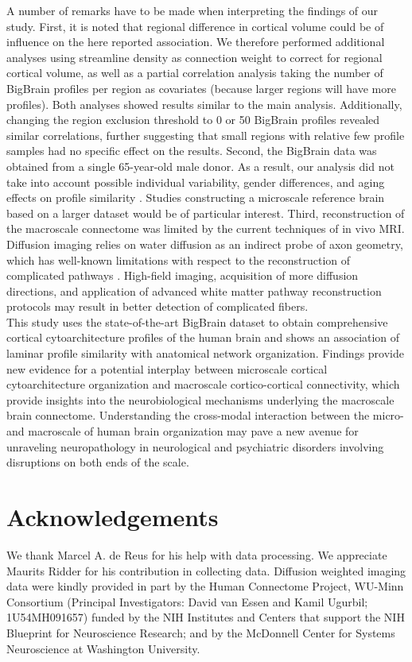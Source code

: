 \begin{refsection}
A number of remarks have to be made when interpreting the findings of our study. First, it is noted that regional difference in cortical volume could be of influence on the here reported association. We therefore performed additional analyses using streamline density as connection weight to correct for regional cortical volume, as well as a partial correlation analysis taking the number of BigBrain profiles per region as covariates (because larger regions will have more profiles). Both analyses showed results similar to the main analysis. Additionally, changing the region exclusion threshold to 0 or 50 BigBrain profiles revealed similar correlations, further suggesting that small regions with relative few profile samples had no specific effect on the results. Second, the BigBrain data was obtained from a single 65-year-old male donor. As a result, our analysis did not take into account possible individual variability, gender differences, and aging effects on profile similarity \citep{Shaw2008NeurodevelopmentalTO,Zilles1997QuantitativeAO}. Studies constructing a microscale reference brain based on a larger dataset would be of particular interest. Third, reconstruction of the macroscale connectome was limited by the current techniques of in vivo MRI. Diffusion imaging relies on water diffusion as an indirect probe of axon geometry, which has well-known limitations with respect to the reconstruction of complicated pathways \citep{Jbabdi2011TractographyWD}. High-field imaging, acquisition of more diffusion directions, and application of advanced white matter pathway reconstruction protocols may result in better detection of complicated fibers.\\

This study uses the state-of-the-art BigBrain dataset to obtain comprehensive cortical cytoarchitecture profiles of the human brain and shows an association of laminar profile similarity with anatomical network organization. Findings provide new evidence for a potential interplay between microscale cortical cytoarchitecture organization and macroscale cortico-cortical connectivity, which provide insights into the neurobiological mechanisms underlying the macroscale brain connectome. Understanding the cross-modal interaction between the micro- and macroscale of human brain organization may pave a new avenue for unraveling neuropathology in neurological and psychiatric disorders involving disruptions on both ends of the scale.

\section*{Acknowledgements}
We thank Marcel A. de Reus for his help with data processing. We appreciate Maurits Ridder for his contribution in collecting data. Diffusion weighted imaging data were kindly provided in part by the Human Connectome Project, WU-Minn Consortium (Principal Investigators: David van Essen and Kamil Ugurbil; 1U54MH091657) funded by the NIH Institutes and Centers that support the NIH Blueprint for Neuroscience Research; and by the McDonnell Center for Systems Neuroscience at Washington University.


\end{refsection}
